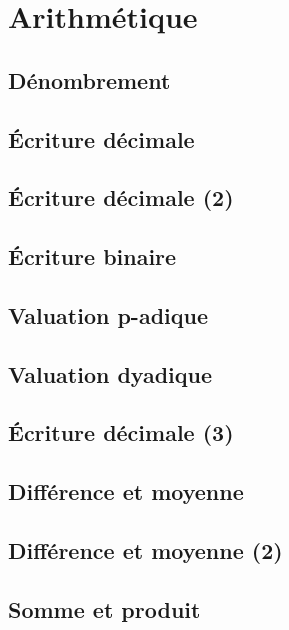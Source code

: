 \chapter{Arithmétique}

\section{Dénombrement} 
 

\section{Écriture décimale} 
 

\section{Écriture décimale (2)} 
 

\section{Écriture binaire} 
 

\section{Valuation p-adique}\label{1.5} 
 

\section{Valuation dyadique}\label{1.6} 
 

\section{Écriture décimale (3)} 
 

\section{Différence et moyenne} 
 

\section{Différence et moyenne (2)} 
 

\section{Somme et produit} 
 

